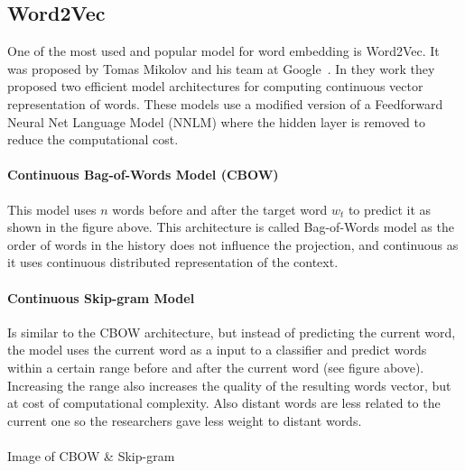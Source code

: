 \subsection{Word2Vec}
One of the most used and popular model for word embedding is Word2Vec. It was proposed by Tomas Mikolov and his team at Google~\cite{mikolov2013efficient}. In they work they proposed two efficient model architectures for computing continuous vector representation of words. These models use a modified version of a Feedforward Neural Net Language Model (NNLM) where the hidden layer is removed to reduce the computational cost.

\paragraph{Continuous Bag-of-Words Model (CBOW)}
This model uses \(n\) words before and after the target word \(w_t\) to predict it as shown in the figure above. This architecture is called Bag-of-Words model as the order of words in the history does not influence the projection, and continuous as it uses continuous distributed representation of the context.
\paragraph{Continuous Skip-gram Model}
Is similar to the CBOW architecture, but instead of predicting the current word, the model uses the current word as a input to a classifier and predict words within a certain range before and after the current word (see figure above). Increasing the range also increases the quality of the resulting words vector, but at cost of computational complexity. Also distant words are less related to the current one so the researchers gave less weight to distant words.
\paragraph{}
Image of CBOW \& Skip-gram